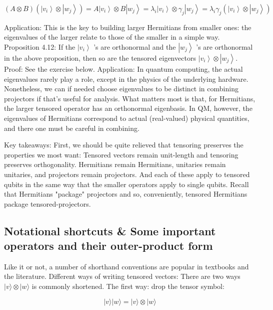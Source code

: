 \documentclass[main.tex]{subfiles}
\begin{document}
    $$
    (A \otimes B)\left(\left|v_{i}\right\rangle \otimes\left|w_{j}\right\rangle\right)=A\left|v_{i}\right\rangle \otimes B\left|w_{j}\right\rangle=\lambda_{i}\left|v_{i}\right\rangle \otimes \gamma_{j}\left|w_{j}\right\rangle=\lambda_{i} \gamma_{j}\left(\left|v_{i}\right\rangle \otimes\left|w_{j}\right\rangle\right)
    $$
    
    Application: This is the key to building larger Hermitians from smaller ones: the eigenvalues of the larger relate to those of the smaller in a simple way. Proposition 4.12: If the $\left|v_{i}\right\rangle$ 's are orthonormal and the $\left|w_{j}\right\rangle$ 's are orthonormal in the above proposition, then so are the tensored eigenvectors $\left|v_{i}\right\rangle \otimes\left|w_{j}\right\rangle$.
    Proof: See the exercise below. Application: In quantum computing, the actual eigenvalues rarely play a role, except in the physics of the underlying hardware. Nonetheless, we can if needed choose eigenvalues to be distinct in combining projectors if that's useful for analysis. What matters most is that, for Hermitians, the larger tensored operator has an orthonormal eigenbasis. In QM, however, the eigenvalues of Hermitians correspond to actual (real-valued) physical quantities, and there one must be careful in combining.
    
    Key takeaways: First, we should be quite relieved that tensoring preserves the properties we most want: Tensored vectors remain unit-length and tensoring preserves orthogonality. Hermitians remain Hermitians, unitaries remain unitaries, and projectors remain projectors. And each of these apply to tensored qubits in the same way that the smaller operators apply to single qubits. Recall that Hermitians "package" projectors and so, conveniently, tensored Hermitians package tensored-projectors.

\subsection{Notational shortcuts \& Some important operators and their outer-product form}

    Like it or not, a number of shorthand conventions are popular in textbooks and the literature. Different ways of writing tensored vectors: There are two ways $|v\rangle \otimes|w\rangle$ is commonly shortened. The first way: drop the tensor symbol:
    
    $$
    |v\rangle|w\rangle=|v\rangle \otimes|w\rangle
    $$
    
\end{document}
